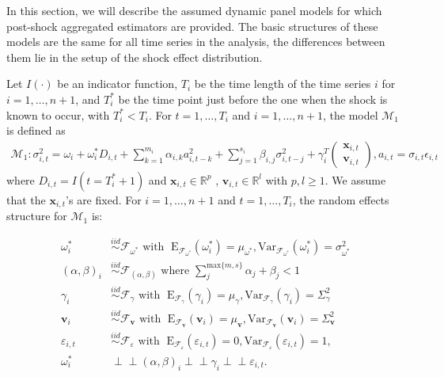 \documentclass[11pt]{article}
\newcommand{\R}{\mathbb{R}}
\newcommand{\x}{\textbf{x}}
\def\mbf#1{\mathbf{#1}} %
\newcommand{\simiid}{\stackrel{iid}{\sim}} %
\newcommand{\indep}{\perp \!\!\! \perp } %
\def\mrm#1{\mathrm{#1}} %
\def\mc#1{\mathcal{#1}} %
\def\mc#1{\mathcal{#1}}
\theoremstyle{definition}
\begin{document}
In this section, we will describe the assumed dynamic panel models for which 
post-shock aggregated estimators are provided. The basic structures of these models 
are the same for all time series in the analysis, the differences between them lie in the setup of the shock effect distribution.

Let $I(\cdot)$ be an indicator function, $T_i$ be the time length of the time series $i$ for $i = 1, \ldots, n+1$, and $T_i^*$ be the time point just before the one when the shock is known to occur, with $T_i^* < T_i$.  For $t= 1, \ldots, T_i$ and $i = 1, \ldots, n+1$, the model $\mc{M}_1$ is defined as
\begin{align}
\mc{M}_1 \colon \sigma^{2}_{i,t} = \omega_{i} + \omega^{*}_i D_{i,t}  + \sum^{m_{i}}_{k=1}\alpha_{i,k}a^{2}_{i,t-k} + \sum_{j=1}^{s_{i}}\beta_{i,j}\sigma_{i,t-j}^{2} + \gamma_{i}^{T} \begin{pmatrix}
          \x_{i,t} \\
           \textbf{v}_{i,t}
           \end{pmatrix}, a_{i,t} = \sigma_{i,t}\epsilon_{i,t} \label{equation1}
\end{align}
 where $D_{i,t} = I(t = T_i^* + 1)$ 
and $\x_{i,t} \in \R^{p}$ , $\textbf{v}_{i,t} \in \R^{l}$ with $p, l \geq 1$.  We assume that the 
$\mbf{x}_{i,t}$'s are fixed.  For $i = 1, \ldots, n+1$ and $t=1, \ldots, T_i$, the random effects structure for $\mc{M}_1$ is:

\begin{align*}
\omega^{*}_i &\simiid \mc{F}_{\omega^{*}} \text{ with }  \; \mrm{E}_{\mc{F}_{\omega^{*}}}(\omega^{*}_i) = \mu_{\omega^{*}}, \mrm{Var}_{\mc{F}_{\omega^{*}}}(\omega^{*}_i)  = \sigma^2_{\omega^{*}}  \\
  (\alpha, \beta)_i &\simiid \mc{F}_{(\alpha, \beta)} \text{ where } \sum^{ \text{max} \{m,s \} }_{j}\alpha_j + \beta_j < 1 \\
   \gamma_i &\simiid \mc{F}_{\gamma} \text{ with }  \; \mrm{E}_{\mc{F}_{\gamma}}(\gamma_i) = \mu_{\gamma}, \mrm{Var}_{\mc{F}_{\gamma}}(\gamma_i)  = \Sigma^2_{\gamma} \\
   \mathbf{v}_i &\simiid \mc{F}_{\mathbf{v}} \text{ with }  \; \mrm{E}_{\mc{F}_{\mathbf{v}}}(\mathbf{v}_i) = \mu_{\mathbf{v}}, \mrm{Var}_{\mc{F}_{\mathbf{v}}}(\mathbf{v}_i)  = \Sigma^2_{\mathbf{v}} \\
\varepsilon_{i,t} & \simiid  \mc{F}_{\varepsilon} \text{ with }  \; \mrm{E}_{\mc{F}_{\varepsilon}}(\varepsilon_{i,t}) = 0, \mrm{Var}_{\mc{F}_{\varepsilon}}(\varepsilon_{i,t})  = 1,  \\
\omega^{*}_i &\indep  (\alpha, \beta)_i \indep \gamma_i \indep \varepsilon_{i,t}.
\end{align*}
\end{document}
